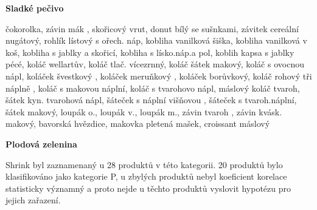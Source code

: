 \textbf{Sladké pečivo}

čokorolka, závin mák , skořicový vrut, donut bílý se sušnkami, závitek cereální nugátový, rohlík lístový s ořech. náp, kobliha vanilková šiška, kobliha vanilková v koš, kobliha s jablky a skořicí, kobliha s lísko.náp.a pol, koblih kapsa s jablky pécé, koláč wellartův, koláč tlač. vícezrnný, koláč šátek makový, koláč s ovocnou nápl, koláček švestkový , koláček meruňkový , koláček borůvkový, koláč rohový tři náplně , koláč s makovou náplní, koláč s tvarohovo nápl, máslový koláč tvaroh, šátek kyn. tvarohová nápl, šáteček s náplní višňovou , šáteček s tvaroh.náplní, šátek makový, loupák o., loupák v., loupák m., závin tvaroh , závin kvásk. makový, bavorská hvězdice, makovka pletená mašek, croissant máslový

\textbf{Plodová zelenina}

Shrink byl zaznamenaný u 28 produktů v této kategorii. 20 produktů bylo klasifikováno jako kategorie P, u zbylých produktů nebyl koeficient korelace statisticky významný a proto nejde u těchto produktů vyslovit hypotézu pro jejich zařazení.






